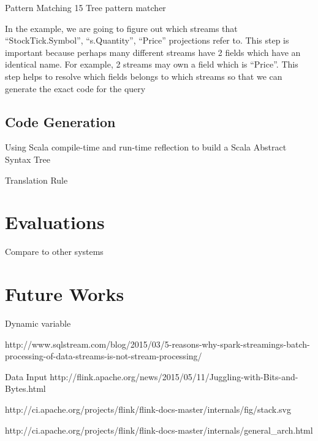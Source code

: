 Pattern Matching
15 Tree pattern matcher


In the example, we are going to figure out  which streams that “StockTick.Symbol”, “s.Quantity”, “Price”  projections refer to. This step is important because perhaps many different streams have 2 fields which have an identical name. For example, 2 streams may own a field which is “Price”. 
This step helps to resolve which fields belongs to which streams so that we can generate the exact code for the query


\subsection{Code Generation}
Using Scala compile-time and run-time reflection to build a Scala Abstract Syntax Tree


Translation Rule


\section{Evaluations}

Compare to other systems


\section{Future Works}

Dynamic variable


http://www.sqlstream.com/blog/2015/03/5-reasons-why-spark-streamings-batch-processing-of-data-streams-is-not-stream-processing/



Data Input
http://flink.apache.org/news/2015/05/11/Juggling-with-Bits-and-Bytes.html


http://ci.apache.org/projects/flink/flink-docs-master/internals/fig/stack.svg

http://ci.apache.org/projects/flink/flink-docs-master/internals/general\_arch.html